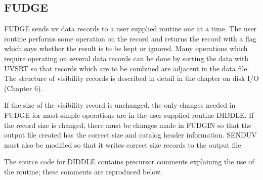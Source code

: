 \subsection{FUDGE}
 FUDGE sends uv data records to a user supplied routine one at a time.
The user routine performs some operation on the record and returns the
record with a flag which says whether the result is to be kept or
ignored.  Many operations which require operating on several data
records can be done by sorting the data with UVSRT so that records
which are to be combined are adjacent in the data file.  The structure
of visibility records is described in detail in the chapter on disk
I/O (Chapter 6).

If the size of the visibility record is unchanged, the only changes
needed in FUDGE for most simple operations are in the user supplied
routine DIDDLE. If the record size is changed, there must be changes
made in FUDGIN so that the output file created has the correct size
and catalog header information.  SENDUV must also be modified so that
it writes correct size records to the output file.

The source code for DIDDLE contains precursor comments explaining the
use of the routine; these comments are reproduced below.

